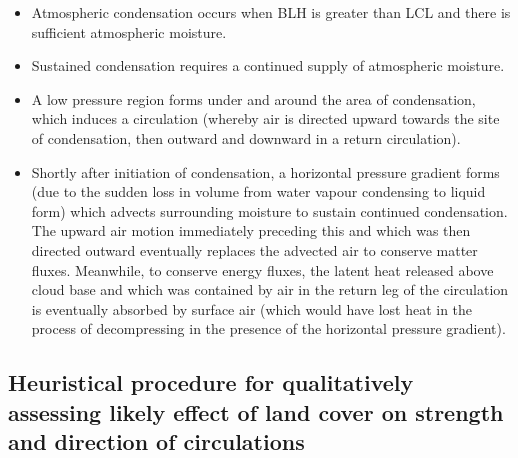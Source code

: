 \begin{itemize}
	\item Atmospheric condensation occurs when \ac{BLH} is greater than \ac{LCL} and there is sufficient atmospheric moisture.
	\item Sustained condensation requires a continued supply of atmospheric moisture.
	\item A low pressure region forms under and around the area of condensation, which induces a circulation (whereby air is directed upward towards the site of condensation, then outward and downward in a return circulation).
	\item Shortly after initiation of condensation, a horizontal pressure gradient forms (due to the sudden loss in volume from water vapour condensing to liquid form) which advects surrounding moisture to sustain continued condensation. The upward air motion immediately preceding this and which was then directed outward eventually replaces the advected air to conserve matter fluxes. Meanwhile, to conserve energy fluxes, the latent heat released above cloud base and which was contained by air in the return leg of the circulation is eventually absorbed by surface air (which would have lost heat in the process of decompressing in the presence of the horizontal pressure gradient).
\end{itemize}

\subsection[Heuristical procedure to assess effect on circulations]{Heuristical procedure for qualitatively assessing likely effect of land cover on strength and direction of circulations}
\label{ssec:heur_proc}

